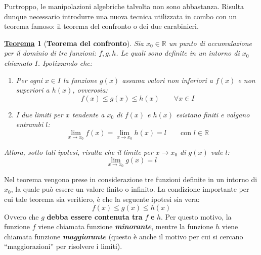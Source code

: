 \documentclass[a4paper]{article}
\newtheorem{theorem}{\textcolor{Red3}{\underline{Teorema}}}
\newcommand{\dquotes}[1]{``#1''}
\begin{document}
	Purtroppo, le manipolazioni algebriche talvolta non sono abbastanza. Risulta dunque necessario introdurre una nuova tecnica utilizzata in combo con un teorema famoso: il teorema del confronto o dei due carabinieri.
	\begin{theorem}[\textbf{Teorema del confronto}]
		Sia $x_{0} \in \mathbb{R}$ un punto di accumulazione per il dominio di tre funzioni: $f,g,h$. Le quali sono definite in un intorno di $x_{0}$ chiamato $I$. Ipotizzando che:
		\begin{enumerate}[label=\alph*)]
			\item Per ogni $x \in I$ la funzione $g\left(x\right)$ assuma valori non inferiori a $f\left(x\right)$ e non superiori a $h\left(x\right)$, ovverosia:
			\begin{equation*}
				f\left(x\right) \le g\left(x\right) \le h\left(x\right) \hspace{2em} \forall x \in I
			\end{equation*}

			\item I due limiti per $x$ tendente a $x_{0}$ di $f\left(x\right)$ e $h\left(x\right)$ esistano finiti e valgano entrambi $l$:
			\begin{equation*}
				\displaystyle\lim_{x\rightarrow x_{0}} f\left(x\right) = \displaystyle\lim_{x\rightarrow x_{0}} h\left(x\right) = l \hspace{2em} \text{con } l \in \mathbb{R}
			\end{equation*}
		\end{enumerate}
		Allora, sotto tali ipotesi, risulta che il limite per $x \rightarrow x_{0}$ di $g\left(x\right)$ vale $l$:
		\begin{equation*}
			\displaystyle\lim_{x\rightarrow x_{0}} g\left(x\right) = l
		\end{equation*}
	\end{theorem}
	Nel teorema vengono prese in considerazione tre funzioni definite in un intorno di $x_{0}$, la quale può essere un valore finito o infinito. La condizione importante per cui tale teorema sia veritiero, è che la seguente ipotesi sia vera:
	\begin{equation*}
		f\left(x\right) \le g\left(x\right) \le h\left(x\right)
	\end{equation*}
	Ovvero che $g$ \textbf{debba essere contenuta tra} $f$ \textbf{e} $h$. Per questo motivo, la funzione $f$ viene chiamata funzione \emph{\textbf{minorante}}, mentre la funzione $h$ viene chiamata funzione \emph{\textbf{maggiorante}} (questo è anche il motivo per cui si cercano \dquotes{maggiorazioni} per risolvere i limiti).\newline
\end{document}
